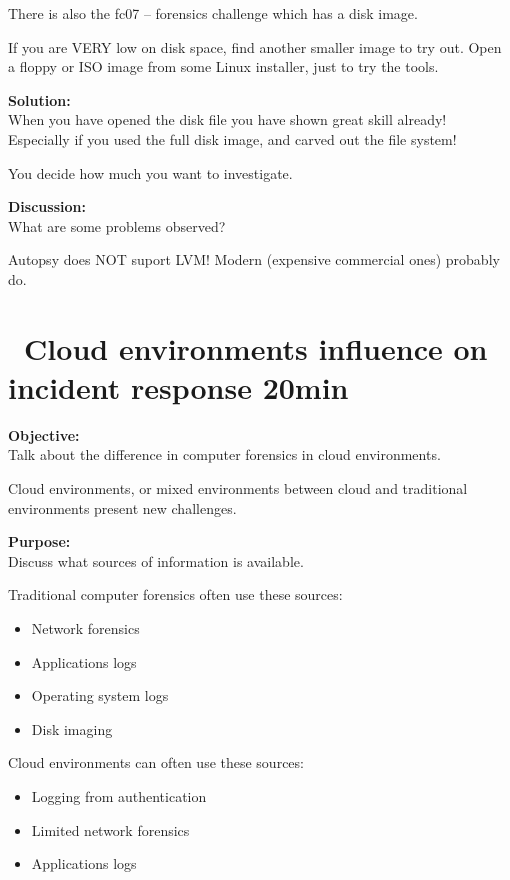 \documentclass[a4paper,11pt,notitlepage]{report}
\begin{document}
There is also the fc07 -- forensics challenge which has a disk image.

If you are VERY low on disk space, find another smaller image to try out. Open a floppy or ISO image from some Linux installer, just to try the tools.

{\bf Solution:}\\
When you have opened the disk file you have shown great skill already! Especially if you used the full disk image, and carved out the file system!

You decide how much you want to investigate.

{\bf Discussion:}\\
What are some problems observed?

Autopsy does NOT suport LVM! Modern (expensive commercial ones) probably do.




\chapter{\faInfoCircle\ Cloud environments influence on incident response 20min}
\label{ex:cloud-incident-response}

{\bf Objective:}\\
Talk about the difference in computer forensics in cloud environments.

Cloud environments, or mixed environments between cloud and traditional environments present new challenges.

{\bf Purpose:}\\
Discuss what sources of information is available.

Traditional computer forensics often use these sources:
\begin{itemize}
\item Network forensics
\item Applications logs
\item Operating system logs
\item Disk imaging
\end{itemize}

Cloud environments can often use these sources:

\begin{itemize}
\item Logging from authentication
\item Limited network forensics
\item Applications logs
\end{itemize}
\end{document}

